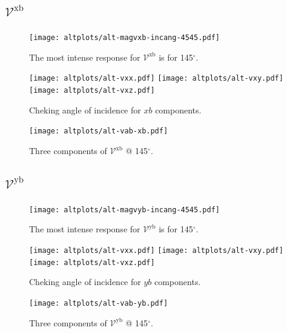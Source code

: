 \documentclass{article}
\let\Oldsubsection\subsection
\renewcommand{\subsection}{\FloatBarrier\Oldsubsection}
\begin{document}
\subsection{$\mathcal{V}^{\mathrm{xb}}$}
\begin{figure}[ht!]
    \centering
    \texttt{[image: altplots/alt-magvxb-incang-4545.pdf]}
    \caption{The most intense response for $\mathcal{V}^{\mathrm{xb}} $ is for 
    145$^{\circ}$.}
    \label{fig:alt-magvxbincang}
\end{figure}
\begin{figure}[ht!]
    \centering
    \texttt{[image: altplots/alt-vxx.pdf]}
    \texttt{[image: altplots/alt-vxy.pdf]}\\
    \texttt{[image: altplots/alt-vxz.pdf]}
    \caption{Cheking angle of incidence for $xb$ components.}
    \label{fig:alt-xbangcomp}
\end{figure}
\begin{figure}[t!]
    \centering
    \texttt{[image: altplots/alt-vab-xb.pdf]}
    \caption{Three components of $\mathcal{V}^{\mathrm{xb}} $ @ 145$^{\circ}$.}
    \label{fig:alt-vxb1}
\end{figure}


\subsection{$\mathcal{V}^{\mathrm{yb}}$}
\begin{figure}[ht]
    \centering
    \texttt{[image: altplots/alt-magvyb-incang-4545.pdf]}
    \caption{The most intense response for $\mathcal{V}^{\mathrm{yb}} $ is for 
    145$^{\circ}$.}
    \label{fig:alt-magvybincang1}
\end{figure}
\begin{figure}[ht]
    \centering
    \texttt{[image: altplots/alt-vxx.pdf]}
    \texttt{[image: altplots/alt-vxy.pdf]}\\
    \texttt{[image: altplots/alt-vxz.pdf]}
    \caption{Cheking angle of incidence for $yb$ components.}
    \label{fig:alt-ybangcomp}
\end{figure}
\begin{figure}[ht]
    \centering
    \texttt{[image: altplots/alt-vab-yb.pdf]}
    \caption{Three components of $\mathcal{V}^{\mathrm{yb}} $ @ 145$^{\circ}$.}
    \label{fig:alt-vyb1}
\end{figure}
\end{document}
